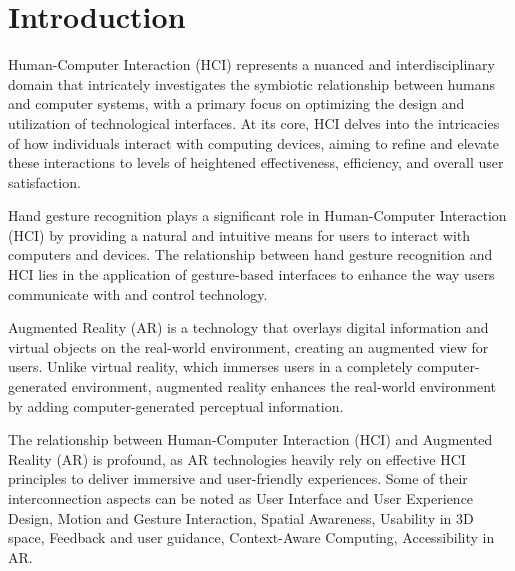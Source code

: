 \documentclass[journal]{IEEEtran}
\begin{document}
% 
% 
% 
% 
\section{Introduction}

 Human-Computer Interaction (HCI) represents a nuanced and interdisciplinary domain that intricately 
investigates the symbiotic relationship between humans and computer systems, with a primary focus on optimizing the design 
and utilization of technological interfaces. At its core, HCI delves into the intricacies of how individuals interact with 
computing devices, aiming to refine and elevate these interactions to levels of heightened effectiveness, efficiency, and 
overall user satisfaction.


Hand gesture recognition plays a significant role in Human-Computer Interaction (HCI) by providing a natural and intuitive means 
for users to interact with computers and devices. The relationship between hand gesture recognition and HCI lies in the application 
of gesture-based interfaces to enhance the way users communicate with and control technology. 

Augmented Reality (AR) is a technology that overlays digital information and virtual objects on the real-world environment, 
creating an augmented view for users. Unlike virtual reality, which immerses users in a completely computer-generated environment, 
augmented reality enhances the real-world environment by adding computer-generated perceptual information.

The relationship between Human-Computer Interaction (HCI) and Augmented Reality (AR) is profound, as AR technologies heavily 
rely on effective HCI principles to deliver immersive and user-friendly experiences. Some of their interconnection aspects can 
be noted as User Interface and User Experience Design, Motion and Gesture Interaction, Spatial Awareness, Usability in 3D space, 
Feedback and user guidance, Context-Aware Computing, Accessibility in AR.
\end{document}
